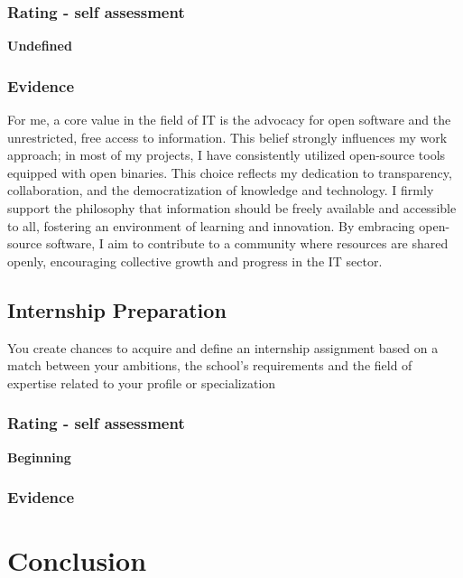 \documentclass[a4paper, 11pt]{article}
\begin{document}
\pagebreak



\subsubsection{Rating - self assessment}
\textbf{Undefined} 
\subsubsection{Evidence}
For me, a core value in the field of IT is the advocacy for open software and the unrestricted, free access to information. This belief strongly influences my work approach; in most of my projects, I have consistently utilized open-source tools equipped with open binaries. This choice reflects my dedication to transparency, collaboration, and the democratization of knowledge and technology. I firmly support the philosophy that information should be freely available and accessible to all, fostering an environment of learning and innovation. By embracing open-source software, I aim to contribute to a community where resources are shared openly, encouraging collective growth and progress in the IT sector.


\subsection{Internship Preparation}
You create chances to acquire and define an internship assignment based on a match between your ambitions, the school's requirements and the field of expertise related to your profile or specialization

\subsubsection{Rating - self assessment}
\textbf{Beginning} 
\subsubsection{Evidence}



\section{Conclusion}
\end{document}
